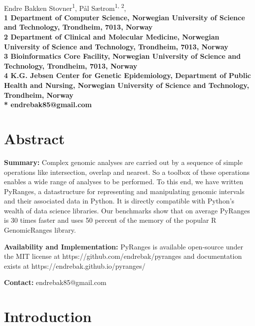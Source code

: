 \documentclass[10pt,letterpaper]{article}
\begin{document}
\vspace*{0.35in}

\begin{flushleft}
{\Large
  \textbf{}
}
\newline
\\
Endre Bakken Stovner\textsuperscript{1},
Pål Sætrom\textsuperscript{1, 2},
\\
\bf{1} Department of
  Computer Science, Norwegian University
  of Science and Technology, Trondheim, 7013, Norway
\\
\bf{2} Department of Clinical and Molecular Medicine, Norwegian
  University of Science and Technology, Trondheim, 7013, Norway
\\
\bf{3} Bioinformatics Core Facility, Norwegian University of Science and
Technology, Trondheim, 7013, Norway
\\
\bf{4} K.G. Jebsen Center for Genetic Epidemiology, Department of Public Health
and Nursing, Norwegian University of Science and Technology, Trondheim, Norway
\\
\bigskip
* endrebak85@gmail.com

\end{flushleft}

\section*{Abstract}

\textbf{Summary:} Complex genomic analyses are carried out by a sequence of
simple operations like intersection, overlap and nearest. So a toolbox of these
operations enables a wide range of analyses to be performed. To this end, we
have written PyRanges, a datastructure for representing and manipulating genomic
intervals and their associated data in Python. It is directly compatible with
Python's wealth of data science libraries. Our benchmarks show that on average
PyRanges is 30 times faster and uses 50 percent of the memory of the popular R
GenomicRanges library.

\textbf{Availability and Implementation:} PyRanges is available open-source under
the MIT license at https://github.com/endrebak/pyranges and documentation exists
at https://endrebak.github.io/pyranges/

\textbf{Contact:} endrebak85@gmail.com

\section*{Introduction}
\end{document}
